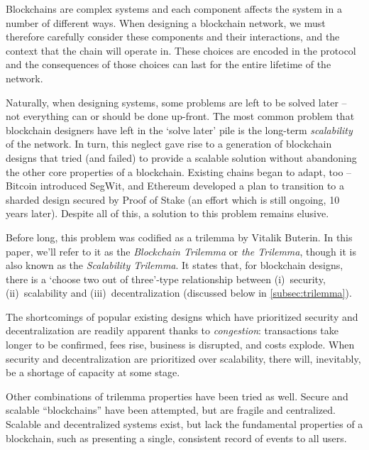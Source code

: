 Blockchains are complex systems and each component affects the system in a number of different ways.
When designing a blockchain network, we must therefore carefully consider these components and their interactions, and the context that the chain will operate in.
These choices are encoded in the protocol and the consequences of those choices can last for the entire lifetime of the network.

Naturally, when designing systems, some problems are left to be solved later -- not everything can or should be done up-front.
The most common problem that blockchain designers have left in the `solve later' pile is the long-term \emph{scalability} of the network.
In turn, this neglect gave rise to a generation of blockchain designs that tried (and failed) to provide a scalable solution without abandoning the other core properties of a blockchain.
Existing chains began to adapt, too -- Bitcoin introduced SegWit, and Ethereum developed a plan to transition to a sharded design secured by Proof of Stake (an effort which is still ongoing, 10 years later).
Despite all of this, a solution to this problem remains elusive.

Before long, this problem was codified as a trilemma by Vitalik Buterin.
In this paper, we'll refer to it as the \emph{Blockchain Trilemma} or \emph{the Trilemma}, though it is also known as the \emph{Scalability Trilemma}.
It states that, for blockchain designs, there is a `choose two out of three'-type relationship between (i)~security, (ii)~scalability and (iii)~decentralization (discussed below in \autoref{subsec:trilemma}).

The shortcomings of popular existing designs which have prioritized security and decentralization are readily apparent thanks to \emph{congestion}: transactions take longer to be confirmed, fees rise, business is disrupted, and costs explode.
When security and decentralization are prioritized over scalability, there will, inevitably, be a shortage of capacity at some stage.

Other combinations of trilemma properties have been tried as well.
Secure and scalable ``blockchains'' have been attempted, but are fragile and centralized.
Scalable and decentralized systems exist, but lack the fundamental properties of a blockchain, such as presenting a single, consistent record of events to all users.

